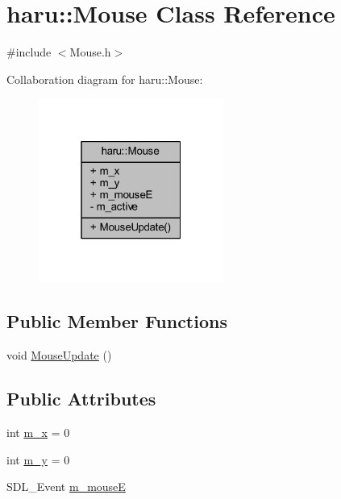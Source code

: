 \hypertarget{classharu_1_1_mouse}{}\section{haru\+:\+:Mouse Class Reference}
\label{classharu_1_1_mouse}


{\ttfamily \#include $<$Mouse.\+h$>$}



Collaboration diagram for haru\+:\+:Mouse\+:\nopagebreak
\begin{figure}[H]
\begin{center}
\leavevmode
\includegraphics[width=172pt]{classharu_1_1_mouse__coll__graph}
\end{center}
\end{figure}
\subsection*{Public Member Functions}
\begin{DoxyCompactItemize}
\item 
void \mbox{\hyperlink{classharu_1_1_mouse_aa12b9821aa46840a997fdfb3e32ddd1e}{Mouse\+Update}} ()
\end{DoxyCompactItemize}
\subsection*{Public Attributes}
\begin{DoxyCompactItemize}
\item 
int \mbox{\hyperlink{classharu_1_1_mouse_a554f48ffbcb1216e483066ab8f941722}{m\+\_\+x}} = 0
\item 
int \mbox{\hyperlink{classharu_1_1_mouse_a7045facf4879e12902aeb852a894327f}{m\+\_\+y}} = 0
\item 
S\+D\+L\+\_\+\+Event \mbox{\hyperlink{classharu_1_1_mouse_ab3f417bf9a76505b33efcaff97465e71}{m\+\_\+mouseE}}
\end{DoxyCompactItemize}

